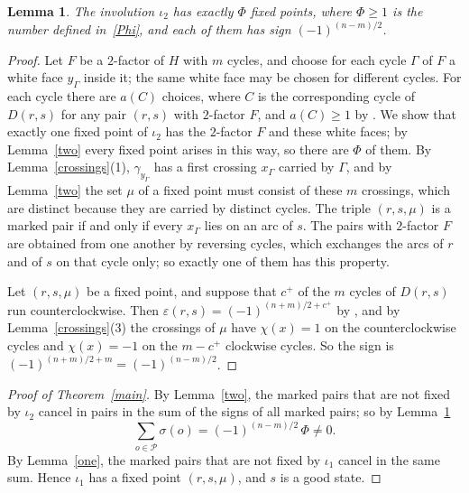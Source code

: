 \documentclass[a4paper]{amsart}
\newtheorem{lemma}[theorem]{Lemma}
\newcommand{\eps}{\varepsilon}
\newcommand{\cP}{\mathcal P}
\begin{document}
\begin{lemma}\label{fixed}
The involution $\iota_2$ has exactly $\Phi$ fixed points, where $\Phi\ge1$ is the number defined in~\eqref{Phi}, and each of them has sign $(-1)^{(n-m)/2}$.
\end{lemma}

\begin{proof}
Let $F$ be a $2$-factor of $H$ with $m$ cycles, and choose for each cycle $\Gamma$ of $F$ a white face $y_\Gamma$ inside it; the same white face may be chosen for different cycles.
For each cycle there are $a(C)$ choices, where $C$ is the corresponding cycle of $D(r,s)$ for any pair $(r,s)$ with $2$-factor $F$, and $a(C)\ge1$ by \cite[Lemma~6.2(1)]{P}.
We show that exactly one fixed point of $\iota_2$ has the $2$-factor $F$ and these white faces; by Lemma~\ref{two} every fixed point arises in this way, so there are $\Phi$ of them.
By Lemma~\ref{crossings}(1), $\gamma_{y_\Gamma}$ has a first crossing $x_\Gamma$ carried by $\Gamma$, and by Lemma~\ref{two} the set $\mu$ of a fixed point must consist of these $m$ crossings, which are distinct because they are carried by distinct cycles.
The triple $(r,s,\mu)$ is a marked pair if and only if every $x_\Gamma$ lies on an arc of $s$.
The pairs with $2$-factor $F$ are obtained from one another by reversing cycles, which exchanges the arcs of $r$ and of $s$ on that cycle only; so exactly one of them has this property.

Let $(r,s,\mu)$ be a fixed point, and suppose that $c^+$ of the $m$ cycles of $D(r,s)$ run counterclockwise.
Then $\eps(r,s)=(-1)^{(n+m)/2+c^+}$ by \cite[Lemma~6.2(3)]{P}, and by Lemma~\ref{crossings}(3) the crossings of $\mu$ have $\chi(x)=1$ on the counterclockwise cycles and $\chi(x)=-1$ on the $m-c^+$ clockwise cycles.
So the sign is $(-1)^{(n+m)/2+m}=(-1)^{(n-m)/2}$.
\end{proof}

\begin{proof}[Proof of Theorem~\ref{main}]
By Lemma~\ref{two}, the marked pairs that are not fixed by $\iota_2$ cancel in pairs in the sum of the signs of all marked pairs; so by Lemma~\ref{fixed}
\begin{equation}\label{count}
\sum_{o\in\cP}\sigma(o)=(-1)^{(n-m)/2}\,\Phi\neq0.
\end{equation}
By Lemma~\ref{one}, the marked pairs that are not fixed by $\iota_1$ cancel in the same sum.
Hence $\iota_1$ has a fixed point $(r,s,\mu)$, and $s$ is a good state.
\end{proof}
\end{document}
